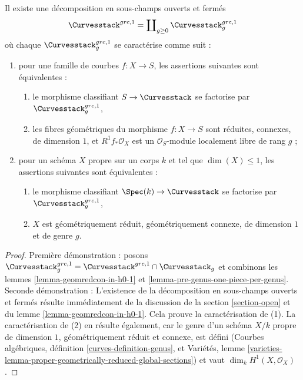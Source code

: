 \begin{lemma}
\label{lemma-one-piece-per-genus}
Il existe une décomposition en sous-champs ouverts et fermés
$$
\Curvesstack^{grc, 1} = \coprod\nolimits_{g \geq 0} \Curvesstack^{grc, 1}_g
$$
où chaque $\Curvesstack^{grc, 1}_g$ se caractérise comme suit :
\begin{enumerate}
\item pour une famille de courbes $f : X \to S$, les assertions suivantes
sont équivalentes :
\begin{enumerate}
\item le morphisme classifiant $S \to \Curvesstack$ se factorise par
$\Curvesstack^{grc, 1}_g$,
\item les fibres géométriques du morphisme $f : X \to S$ sont
réduites, connexes, de dimension $1$, et
$R^1f_*\mathcal{O}_X$ est un $\mathcal{O}_S$-module localement libre
de rang $g$ ;
\end{enumerate}
\item pour un schéma $X$ propre sur un corps $k$ et tel que $\dim(X) \leq 1$,
les assertions suivantes sont équivalentes :
\begin{enumerate}
\item le morphisme classifiant $\Spec(k) \to \Curvesstack$ se factorise par
$\Curvesstack^{grc, 1}_g$,
\item $X$ est géométriquement réduit, géométriquement connexe,
de dimension $1$ et de genre $g$.
\end{enumerate}
\end{enumerate}
\end{lemma}

\begin{proof}
Première démonstration : posons
$\Curvesstack^{grc, 1}_g = \Curvesstack^{grc, 1} \cap \Curvesstack_g$
et combinons les lemmes \ref{lemma-geomredcon-in-h0-1} et
\ref{lemma-pre-genus-one-piece-per-genus}.
Seconde démonstration :
L'existence de la décomposition en sous-champs ouverts et fermés
résulte immédiatement de la discussion de la section \ref{section-open}
et du lemme \ref{lemma-geomredcon-in-h0-1}.
Cela prouve la caractérisation de (1).
La caractérisation de (2) en résulte également, car
le genre d'un schéma $X/k$ propre de dimension $1$,
géométriquement réduit et connexe, est défini
(Courbes algébriques, définition \ref{curves-definition-genus}, et
Variétés, lemme
\ref{varieties-lemma-proper-geometrically-reduced-global-sections})
et vaut $\dim_k H^1(X, \mathcal{O}_X)$.
\end{proof}


